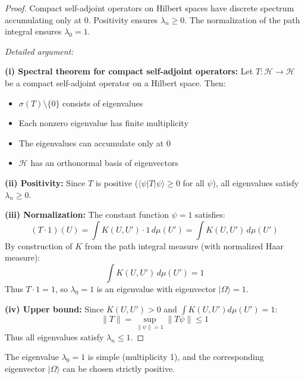 \begin{proof}
Compact self-adjoint operators on Hilbert spaces have discrete spectrum 
accumulating only at 0. Positivity ensures $\lambda_n \geq 0$. The normalization 
of the path integral ensures $\lambda_0 = 1$.

\textit{Detailed argument:}

\textbf{(i) Spectral theorem for compact self-adjoint operators:} 
Let $T : \mathcal{H} \to \mathcal{H}$ be a compact self-adjoint operator on a 
Hilbert space. Then:
\begin{itemize}
\item $\sigma(T) \setminus \{0\}$ consists of eigenvalues
\item Each nonzero eigenvalue has finite multiplicity
\item The eigenvalues can accumulate only at 0
\item $\mathcal{H}$ has an orthonormal basis of eigenvectors
\end{itemize}

\textbf{(ii) Positivity:} Since $T$ is positive ($\langle \psi | T | \psi \rangle \geq 0$ 
for all $\psi$), all eigenvalues satisfy $\lambda_n \geq 0$.

\textbf{(iii) Normalization:} The constant function $\psi = 1$ satisfies:
\[
(T \cdot 1)(U) = \int K(U, U') \cdot 1 \, d\mu(U') = \int K(U, U') \, d\mu(U')
\]
By construction of $K$ from the path integral measure (with normalized Haar measure):
\[
\int K(U, U') \, d\mu(U') = 1
\]
Thus $T \cdot 1 = 1$, so $\lambda_0 = 1$ is an eigenvalue with eigenvector 
$|\Omega\rangle = 1$.

\textbf{(iv) Upper bound:} Since $K(U, U') > 0$ and $\int K(U, U') d\mu(U') = 1$:
\[
\|T\| = \sup_{\|\psi\| = 1} \|T\psi\| \leq 1
\]
Thus all eigenvalues satisfy $\lambda_n \leq 1$.
\end{proof}

\begin{theorem}
\label{thm:perron-frobenius}
The eigenvalue $\lambda_0 = 1$ is simple (multiplicity 1), and the corresponding 
eigenvector $|\Omega\rangle$ can be chosen strictly positive.
\end{theorem}

